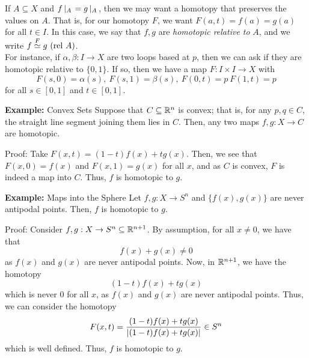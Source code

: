 
If $A \subseteq X$ and $f \left|_{A}\right. = g \left|_{A}\right.$, then we may want a homotopy that preserves the values on $A$. That is, for our homotopy $F$, we want $F(a, t) = f(a) = g(a)$ for all $t \in I$. In this case, we say that $f, g$ are \emph{homotopic relative to }$A$, and we write $f \overset{F}{\simeq} g\ (\tt{rel } A)$.\\

For instance, if $\alpha, \beta : I \to X$ are two loops based at $p$, then we can ask if they are homotopic relative to $\{0, 1\}$. If so, then we have a map $F : I \times I \to X$ with
\[ F(s, 0) = \alpha(s),\ F(s, 1) = \beta(s),\ F(0, t) = p\ F(1, t) = p \]
for all $s \in [0, 1]$ and $t \in [0, 1]$.\\


\begin{example}{\textbf{Example:} Convex Sets}
    Suppose that $C \subseteq \mathbb{R}^n$ is convex; that is, for any $p, q \in C$, the straight line segment joining them lies in $C$. Then, any two maps $f, g : X \to C$ are homotopic.
\end{example}
\begin{solution}{Proof:}
    Take $F(x, t) = (1 - t)f(x) + tg(x)$. Then, we see that $F(x, 0) = f(x)$ and $F(x, 1) = g(x)$ for all $x$, and as $C$ is convex, $F$ is indeed a map into $C$. Thus, $f$ is homotopic to $g$. 
\end{solution}

\begin{example}{\textbf{Example:} Maps into the Sphere}
    Let $f,g : X \to S^n$ and $\{f(x), g(x)\}$ are never antipodal points. Then, $f$ is homotopic to $g$. 
\end{example}
\begin{solution}{Proof:}
    Consider $f, g : X \to S^n \subseteq \mathbb{R}^{n + 1}$. By assumption, for all $x \ne 0$, we have that
    \[ f(x) + g(x) \ne 0 \]
    as $f(x)$ and $g(x)$ are never antipodal points. Now, in $\mathbb{R}^{n + 1}$, we have the homotopy
    \[ (1 - t)f(x) + tg(x) \]
    which is never $0$ for all $x$, as $f(x)$ and $g(x)$ are never antipodal points. Thus, we can consider the homotopy
    \[ F(x, t) = \frac{(1 - t)f(x) + tg(x)}{\left\lvert {(1 - t)f(x) + tg(x)} \right\rvert} \in S^{n} \]
    which is well defined. Thus, $f$ is homotopic to $g$. 
\end{solution}

